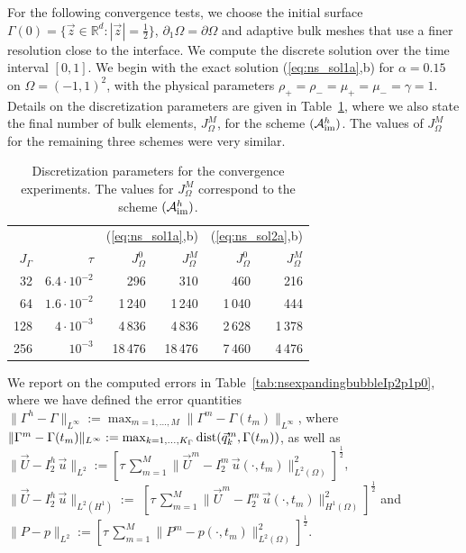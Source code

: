 \documentclass[a4paper,12pt,onecolumn]{article}
\newcommand{\R}{\mathbb R}
\newcommand{\errorXx}{\|\Gamma^h - \Gamma\|_{L^\infty}}
\newcommand{\LerrorUu}[1]{\|\vec U - I^h_{#1}\,\vec u\|_{L^2}}
\newcommand{\HerrorUu}[1]{\|\vec U - I^h_{#1}\,\vec u\|_{L^2(H^1)}}
\newcommand{\LerrorPp}{\|P - p\|_{L^2}}
\newcommand{\schemeAim}{{\mathcal{A}^h_{\rm im}}}
\begin{document}
For the following convergence tests,
we choose the initial surface $\Gamma(0) = \{ \vec z \in \R^d : |\vec z| =
\frac12 \}$, $\partial_1\Omega=\partial\Omega$ and
adaptive bulk meshes that use a finer resolution close to the interface. We
compute the discrete solution over the time interval $[0,1]$.
We begin with the exact solution (\ref{eq:ns_sol1a},b) for $\alpha = 0.15$
on $\Omega = (-1,1)^2$, with the physical parameters
$\rho_+ = \rho_- = \mu_+ = \mu_- = \gamma = 1$.
Details on the discretization parameters are given in
Table~\ref{tab:nsexpandingbubbleelements}, where we also state the final
number of bulk elements, $J_\Omega^M$, for the scheme $(\schemeAim)$.
The values of $J_\Omega^M$ for the remaining three schemes were very similar.
\begin{table}
\center
\begin{tabular}{rrrrrr}
\hline
& & \multicolumn{2}{c}{(\ref{eq:ns_sol1a},b)} &
    \multicolumn{2}{c}{(\ref{eq:ns_sol2a},b)} \\
$J_\Gamma$ & $\tau$
& $J_\Omega^0$ & $J_\Omega^M$ & $J_\Omega^0$ & $J_\Omega^M$ \\
\hline
 32 & $6.4\cdot10^{-2}$ &     296 &     310 &  460   &  216 \\
 64 & $1.6\cdot10^{-2}$ &  1\,240 &  1\,240 & 1\,040 &  444 \\
128 &   $4\cdot10^{-3}$ &  4\,836 &  4\,836 & 2\,628 & 1\,378 \\
256 &         $10^{-3}$ & 18\,476 & 18\,476 & 7\,460 & 4\,476 \\
\hline
\end{tabular}
\caption[Navier--Stokes expanding bubble meshes parameters]
{Discretization parameters for the convergence experiments. The values for
$J_\Omega^M$ correspond to the scheme $(\schemeAim)$.}
\label{tab:nsexpandingbubbleelements}
\end{table}%
We report on the computed errors in Table~\ref{tab:nsexpandingbubbleIp2p1p0},
where we have defined the error quantities
$\errorXx := \max_{m=1,\ldots, M} \|\Gamma^m - \Gamma(t_m)\|_{L^\infty}$,
where $\|\Gamma^m - \Gamma(t_m)\|_{L^\infty} :=
\max_{k=1,\ldots, K_\Gamma} {\rm dist}( \vec q^m_k, \Gamma(t_m))$,
as well as
$\LerrorUu2 := \left[\tau\,\sum_{m=1}^M \|\vec U^m - I^m_2\,\vec u(\cdot,
t_m)\|_{L^2(\Omega)}^2 \right]^\frac12$,
$\HerrorUu2 := $ \linebreak
$\left[\tau\,\sum_{m=1}^M \|\vec U^m - I^m_2\,\vec u(\cdot,
t_m)\|_{H^1(\Omega)}^2 \right]^\frac12$
and
$\LerrorPp := \left[\tau\,\sum_{m=1}^M \|P^m - p(\cdot,t_m)\|_{L^2(\Omega)}^2
\right]^\frac12$.
\end{document}
